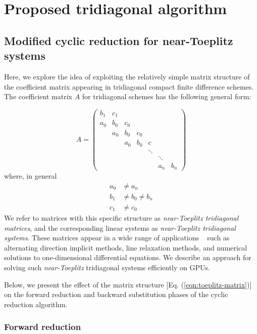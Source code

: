 \chapter{Proposed tridiagonal algorithm}

\section{Modified cyclic reduction for near-Toeplitz systems}

Here, we explore the idea of
exploiting the relatively simple matrix structure
of the coefficient matrix appearing in
tridiagonal compact finite difference schemes.
The coefficient matrix $A$ for tridiagonal schemes
has the following general form:

\begin{equation} \label{eqn:toeplitz-matrix}
A = 
\begin{pmatrix}
     b_1 & c_1  \\
     a_0 & b_0  &  c_0  \\
         & a_0  &  b_0 &  c_0  \\
         &      &  a_0 &  b_0 &  c    \\
         &      &      &      &  \ddots \\
         &      &      &      &     &  \ddots  \\
         &      &      &      &     &  a_n  &  b_n
\end{pmatrix}
\end{equation}
%
where, in general
\begin{align*}
    a_0 &\neq a_n  \\
    b_1 &\neq b_0 \neq b_n \\
    c_1 &\neq c_0 
\end{align*}
%
We refer to matrices with this specific structure as
\emph{near-Toeplitz tridiagonal matrices},
and the corresponding linear systems as
\emph{near-Toeplitz tridiagonal systems}.
These matrices appear in a wide range of applications
~\cite{sun1995application}
such as alternating direction implicit methods,
line relaxation methods,
and numerical solutions to one-dimensional differential equations.
We describe an approach for solving such
\emph{near-Toeplitz} tridiagonal systems efficiently on GPUs.

Below, we present the effect of the matrix structure
[Eq. (\ref{eqn:toeplitz-matrix})] on the
forward reduction and backward substitution phases of
the cyclic reduction algorithm.

\subsection{Forward reduction}

